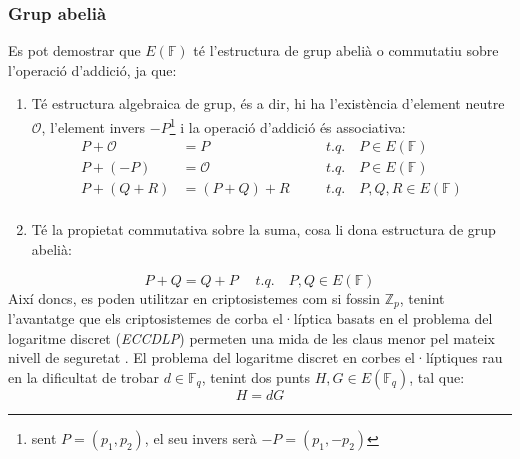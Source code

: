 \documentclass{article}
\begin{document}
\subsubsection{Grup abelià}
Es pot demostrar que $E(\mathbb{F})$ té l'estructura de grup abelià o commutatiu sobre l'operació d'addició, ja que:
\begin{enumerate}
	\item Té estructura algebraica de grup, és a dir, hi ha l'existència d'element neutre $\mathcal{O}$, l'element invers $-P$\footnote{sent $P=(p_1, p_2)$, el seu invers serà $-P = (p_1, -p_2)$} i la operació d'addició és associativa:
	\begin{equation*}
		\begin{aligned}
			P + \mathcal{O} &= P & \quad & t.q. \quad P \in E(\mathbb{F})\\
			P + (-P) &= \mathcal{O} & \quad & t.q. \quad P \in E(\mathbb{F})\\
			P + (Q + R) &= (P + Q) + R & \quad & t.q. \quad P, Q, R \in E(\mathbb{F})\\
		\end{aligned}
	\end{equation*}
	\item Té la propietat commutativa sobre la suma, cosa li dona estructura de grup abelià:
\end{enumerate}
\[ P + Q = Q + P  \quad \; t.q. \quad P, Q \in E(\mathbb{F}) \]
Així doncs, es poden utilitzar en criptosistemes com si fossin $\mathbb{Z}_p$, tenint l'avantatge que els criptosistemes de corba el·líptica basats en el problema del logaritme discret (\textit{ECCDLP}) permeten una mida de les claus menor pel mateix nivell de seguretat \cite{nist-ecc}. El problema del logaritme discret en corbes el·líptiques rau en la dificultat de trobar $d \in \mathbb{F}_q$, tenint dos punts $H, G \in E(\mathbb{F}_q)$, tal que:
\[H = dG\]
\end{document}
